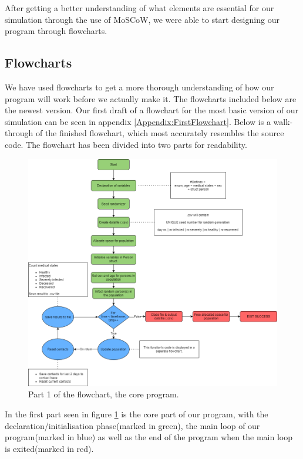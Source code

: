 After getting a better understanding of what elements are essential for our simulation through the use of MoSCoW, we were able to start designing our program through flowcharts.

\subsection{Flowcharts} \label{sub: flowcharts}
We have used flowcharts to get a more thorough understanding of how our program will work before we actually make it. The flowcharts included below are the newest version. Our first draft of a flowchart for the most basic version of our simulation can be seen in appendix \vref{Appendix:FirstFlowchart}. Below is a walk-through of the finished flowchart, which most accurately resembles the source code. The flowchart has been divided into two parts for readability.

\begin{figure}[H]
  \centering
  \includegraphics[width=\textwidth]{0_billeder/Part1Flowchart.png}
  \caption{Part 1 of the flowchart, the core program.}
  \label{fig:Part1Flow}
\end{figure}

In the first part seen in figure \ref{fig:Part1Flow} is the core part of our program, with the declaration/initialisation phase(marked in green), the main loop of our program(marked in blue) as well as the end of the program when the main loop is exited(marked in red).

